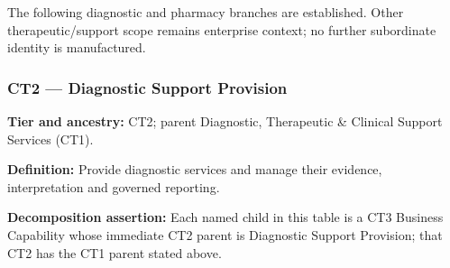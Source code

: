 The following diagnostic and pharmacy branches are established. Other therapeutic/\allowbreak{}support scope remains enterprise context; no further subordinate identity is manufactured.

\label{rad:business:457}
\subsubsection*{CT2 — Diagnostic Support Provision}
\label{rad:business:459}

\textbf{Tier and ancestry:} CT2; parent Diagnostic, Therapeutic \& Clinical Support Services (CT1).

\label{rad:business:461}

\textbf{Definition:} Provide diagnostic services and manage their evidence, interpretation and governed reporting.

\label{rad:business:463}

\textbf{Decomposition assertion:} Each named child in this table is a CT3 Business Capability whose immediate CT2 parent is Diagnostic Support Provision; that CT2 has the CT1 parent stated above.

